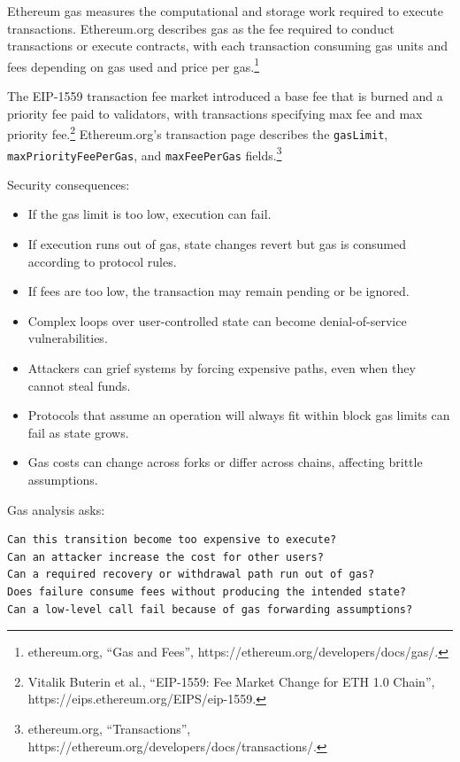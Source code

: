 Ethereum gas measures the computational and storage work required to
execute transactions. Ethereum.org describes gas as the fee required to
conduct transactions or execute contracts, with each transaction
consuming gas units and fees depending on gas used and price per
gas.\footnote{ethereum.org, ``Gas and Fees'',
  https://ethereum.org/developers/docs/gas/.}

The EIP-1559 transaction fee market introduced a base fee that is burned
and a priority fee paid to validators, with transactions specifying max
fee and max priority fee.\footnote{Vitalik Buterin et al., ``EIP-1559:
  Fee Market Change for ETH 1.0 Chain'',
  https://eips.ethereum.org/EIPS/eip-1559.} Ethereum.org's transaction
page describes the \passthrough{\lstinline!gasLimit!},
\passthrough{\lstinline!maxPriorityFeePerGas!}, and
\passthrough{\lstinline!maxFeePerGas!} fields.\footnote{ethereum.org,
  ``Transactions'', https://ethereum.org/developers/docs/transactions/.}

Security consequences:

\begin{itemize}
\tightlist
\item
  If the gas limit is too low, execution can fail.
\item
  If execution runs out of gas, state changes revert but gas is consumed
  according to protocol rules.
\item
  If fees are too low, the transaction may remain pending or be ignored.
\item
  Complex loops over user-controlled state can become denial-of-service
  vulnerabilities.
\item
  Attackers can grief systems by forcing expensive paths, even when they
  cannot steal funds.
\item
  Protocols that assume an operation will always fit within block gas
  limits can fail as state grows.
\item
  Gas costs can change across forks or differ across chains, affecting
  brittle assumptions.
\end{itemize}

Gas analysis asks:

\begin{lstlisting}
Can this transition become too expensive to execute?
Can an attacker increase the cost for other users?
Can a required recovery or withdrawal path run out of gas?
Does failure consume fees without producing the intended state?
Can a low-level call fail because of gas forwarding assumptions?
\end{lstlisting}


